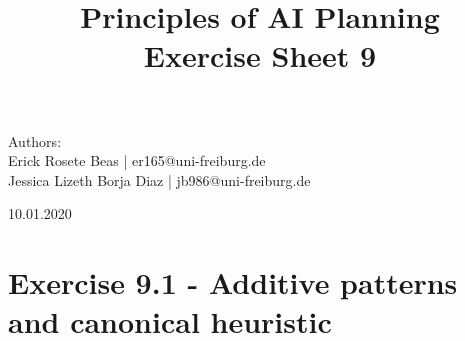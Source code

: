 \documentclass[11pt,a4paper]{article}
\title{\textbf{Principles of AI Planning
		\\{\Large Exercise Sheet 9}}}
\begin{document}
\begin{flushleft}
	Authors:\\
	Erick Rosete Beas | er165@uni-freiburg.de\\
	Jessica Lizeth Borja Diaz | jb986@uni-freiburg.de\\
\end{flushleft}
{\let\newpage\relax\maketitle}
\begin{center} 
	\large 10.01.2020
\end{center}


\section*{Exercise 9.1 - Additive patterns and canonical heuristic}
\end{document}

